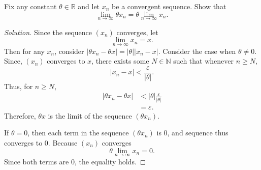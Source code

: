 \documentclass[11pt,letterpaper]{article}
\newcommand{\N}{\mathbb{N}}
\newcommand{\R}{\mathbb{R}}
\newcommand{\eps}{\varepsilon}
\renewcommand{\epsilon}{\eps}
\newenvironment{prob}[1]
  {\renewcommand\theinnerprob{#1}\innerprob}
  {\endinnerprob}
\newenvironment{solution}
  {\renewcommand\qedsymbol{}\begin{proof}[Solution]}
  {\end{proof}\bigskip}
\begin{document}
\begin{prob}{6} %
Fix any constant $\theta \in \R$ and let $x_n$ be a convergent sequence.  Show that
\[
	\lim_{n\to\infty} \theta x_n = \theta \lim_{n\to\infty}x_n.
\]
\end{prob}
\begin{solution}
	Since the sequence $(x_n)$ converges, let $$ \lim_{n\to\infty} x_n = x.$$ Then for any $x_n$, consider $|\theta x_n - \theta x| = |\theta||x_n - x|$. Consider the case when $\theta \not= 0$. Since, $(x_n)$ converges to $x$, there exists some $N \in \N$ such that whenever $n \geq N$, $$|x_n - x| < \frac{\epsilon}{|\theta |}.$$ Thus, for $n\geq N$, 
	\[\begin{split}
		|\theta x_n - \theta x| &< |\theta|\frac{\epsilon}{|\theta |}\\
		&= \epsilon.
	\end{split}\]
	Therefore, $\theta x$ is the limit of the sequence $(\theta x_n)$.
	
	If $\theta = 0$, then each term in the sequence $(\theta x_n)$ is $0$, and sequence thus converges to $0$. Because $(x_n)$ converges $$\theta \lim_{n\to\infty}x_n = 0.$$ Since both terms are $0$, the equality holds. 
\end{solution}
\newpage
\end{document}
